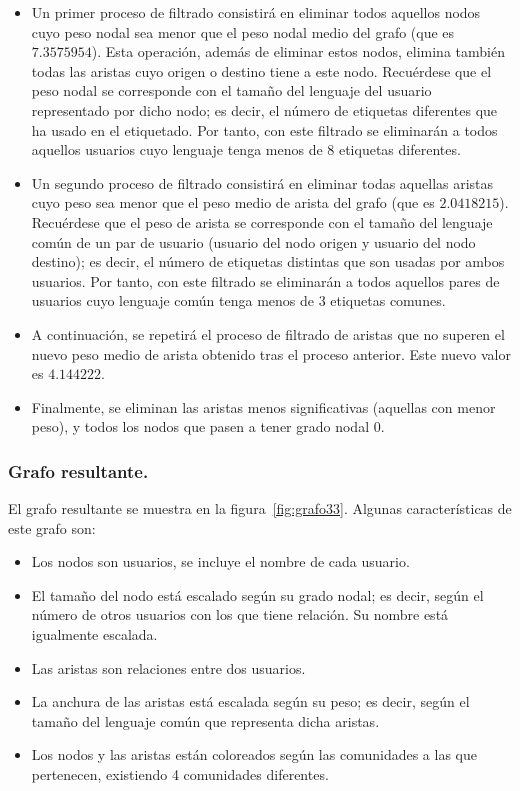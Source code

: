 \begin{itemize}
\item    Un primer proceso de filtrado consistirá en eliminar todos aquellos nodos cuyo peso nodal sea menor que el peso nodal medio del grafo (que es $7.3575954$). Esta operación, además de eliminar estos nodos, elimina también todas las aristas cuyo origen o destino tiene a este nodo. Recuérdese que el peso nodal se corresponde con el tamaño del lenguaje del usuario representado por dicho nodo; es decir, el número de etiquetas diferentes que ha usado en el etiquetado. Por tanto, con este filtrado se eliminarán a todos aquellos usuarios cuyo lenguaje tenga menos de 8 etiquetas diferentes.
\item    Un segundo proceso de filtrado consistirá en eliminar todas aquellas aristas cuyo peso sea menor que el peso medio de arista del grafo (que es $2.0418215$). Recuérdese que el peso de arista se corresponde con el tamaño del lenguaje común de un par de usuario (usuario del nodo origen y usuario del nodo destino); es decir, el número de etiquetas distintas que son usadas por ambos usuarios. Por tanto, con este filtrado se eliminarán a todos aquellos pares de usuarios cuyo lenguaje común tenga menos de 3 etiquetas comunes.
\item A continuación, se repetirá el proceso de filtrado de aristas que no superen el nuevo peso medio de arista obtenido tras el proceso anterior. Este nuevo valor es $4.144222$.
\item Finalmente, se eliminan las aristas menos significativas (aquellas con menor peso), y todos los nodos que pasen a tener grado nodal 0.
\end{itemize}


\subsubsection{Grafo resultante.}

El grafo resultante se muestra en la figura~\ref{fig:grafo33}. Algunas características de este grafo son:

\begin{itemize}
\item    Los nodos son usuarios, se incluye el nombre de cada usuario.
\item    El tamaño del nodo está escalado según su grado nodal; es decir, según el número de otros usuarios con los que tiene relación. Su nombre está igualmente escalada.
\item    Las aristas son relaciones entre dos usuarios.
\item    La anchura de las aristas está escalada según su peso; es decir, según el tamaño del lenguaje común que representa dicha aristas.
\item    Los nodos y las aristas están coloreados según las comunidades a las que pertenecen, existiendo 4 comunidades diferentes.
\end{itemize}

